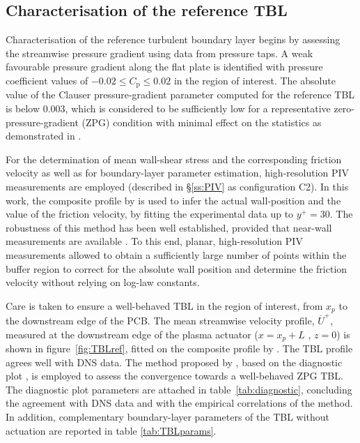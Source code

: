 \subsection{Characterisation of the reference TBL \label{ss:refTBL}}
Characterisation of the reference turbulent boundary layer begins by assessing the streamwise pressure gradient using data from pressure taps. A weak favourable pressure gradient along the flat plate is identified with pressure coefficient values of $-0.02 \leq C_\mathrm{p} \leq 0.02$ in the region of interest.
The absolute value of the Clauser pressure-gradient parameter computed for the reference TBL is below 0.003, which is considered to be sufficiently low for a representative zero-pressure-gradient (ZPG) condition with minimal effect on the statistics as demonstrated in \citet{guemes2019APG}.

For the determination of mean wall-shear stress and the corresponding friction velocity as well as for boundary-layer parameter estimation, high-resolution PIV measurements are employed (described in \S\ref{ss:PIV} as configuration C2). In this work, the composite profile by \citet{chauhan2009} is used to infer the actual wall-position and the value of the friction velocity, by fitting the experimental data up to $y^+ = 30$. The robustness of this method has been well established, provided that near-wall measurements are available \citep{orlu2010wallpos,rodriguez2015skinfric,vinuesa2016nagib}. To this end, planar, high-resolution PIV measurements allowed to obtain a sufficiently large number of points within the buffer region to correct for the absolute wall position and determine the friction velocity without relying on log-law constants.

Care is taken to ensure a well-behaved TBL in the region of interest, from $x_p$ to the downstream edge of the PCB. The mean streamwise velocity profile, $\overline{U}^+$, measured at the downstream edge of the plasma actuator ($x=x_p + L$ , $z = 0$) is shown in figure~\ref{fig:TBLref}, fitted on the composite profile by \citet{chauhan2009}. The TBL profile agrees well with \citet{jimenez2010} DNS data. The method proposed by \citet{sanmiguel2017diagnostic}, based on the diagnostic plot \citep{alfredsson2011diagnostic}, is employed to assess the convergence towards a well-behaved ZPG TBL. The diagnostic plot parameters are attached in table~\ref{tab:diagnostic}, concluding the agreement with DNS data and with the empirical correlations of the method. In addition, complementary boundary-layer parameters of the TBL without actuation are reported in table \ref{tab:TBLparams}.

